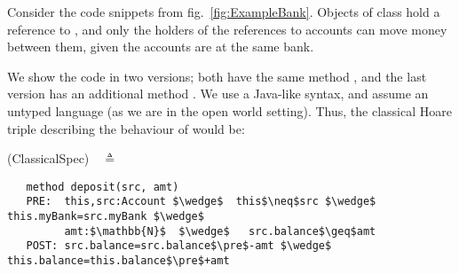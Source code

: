 
Consider the code snippets from fig.~\ref{fig:ExampleBank}. Objects of
 class  hold a reference to , and only the holders of the references to accounts can move money between them, given the accounts are at the same bank.

 We show the code in two versions; both have the same method , and the last version 
 has an additional method .
  We use a Java-like syntax, and assume an untyped language (as we are in the open world setting).
 Thus, the classical Hoare triple describing the behaviour of  would be:
 
 \vspace{0.1in}
(ClassicalSpec)\ \  $\triangleq$\\ 
\vspace{-0.22in}
\begin{lstlisting}
   method deposit(src, amt)
   PRE:  this,src:Account $\wedge$  this$\neq$src $\wedge$ this.myBank=src.myBank $\wedge$ 
         amt:$\mathbb{N}$  $\wedge$   src.balance$\geq$amt
   POST: src.balance=src.balance$\pre$-amt $\wedge$ this.balance=this.balance$\pre$+amt
\end{lstlisting}
\vspace{-0.1in}

